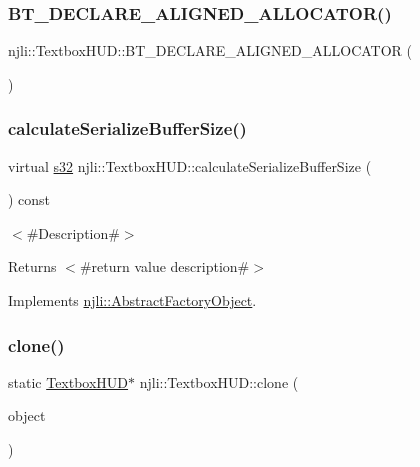 \subsubsection{\texorpdfstring{B\+T\+\_\+\+D\+E\+C\+L\+A\+R\+E\+\_\+\+A\+L\+I\+G\+N\+E\+D\+\_\+\+A\+L\+L\+O\+C\+A\+T\+O\+R()}{BT\_DECLARE\_ALIGNED\_ALLOCATOR()}}
{\footnotesize\ttfamily njli\+::\+Textbox\+H\+U\+D\+::\+B\+T\+\_\+\+D\+E\+C\+L\+A\+R\+E\+\_\+\+A\+L\+I\+G\+N\+E\+D\+\_\+\+A\+L\+L\+O\+C\+A\+T\+OR (\begin{DoxyParamCaption}{ }\end{DoxyParamCaption})\hspace{0.3cm}{\ttfamily [protected]}}

\mbox{\label{classnjli_1_1_textbox_h_u_d_a770a618174161243eaded9c652e31fb9}} 
\subsubsection{\texorpdfstring{calculate\+Serialize\+Buffer\+Size()}{calculateSerializeBufferSize()}}
{\footnotesize\ttfamily virtual \mbox{\hyperlink{_util_8h_aa62c75d314a0d1f37f79c4b73b2292e2}{s32}} njli\+::\+Textbox\+H\+U\+D\+::calculate\+Serialize\+Buffer\+Size (\begin{DoxyParamCaption}{ }\end{DoxyParamCaption}) const\hspace{0.3cm}{\ttfamily [virtual]}}

$<$\#\+Description\#$>$

\begin{DoxyReturn}{Returns}
$<$\#return value description\#$>$ 
\end{DoxyReturn}


Implements \mbox{\hyperlink{classnjli_1_1_abstract_factory_object_a4763d05bc9dc37c559111f8bb30e1dd8}{njli\+::\+Abstract\+Factory\+Object}}.

\mbox{\label{classnjli_1_1_textbox_h_u_d_a449d54db2ec81d190030f89307d79f8b}} 
\subsubsection{\texorpdfstring{clone()}{clone()}}
{\footnotesize\ttfamily static \mbox{\hyperlink{classnjli_1_1_textbox_h_u_d}{Textbox\+H\+UD}}$\ast$ njli\+::\+Textbox\+H\+U\+D\+::clone (\begin{DoxyParamCaption}\item[{const \mbox{\hyperlink{classnjli_1_1_textbox_h_u_d}{Textbox\+H\+UD}} \&}]{object }\end{DoxyParamCaption})\hspace{0.3cm}{\ttfamily [static]}}

